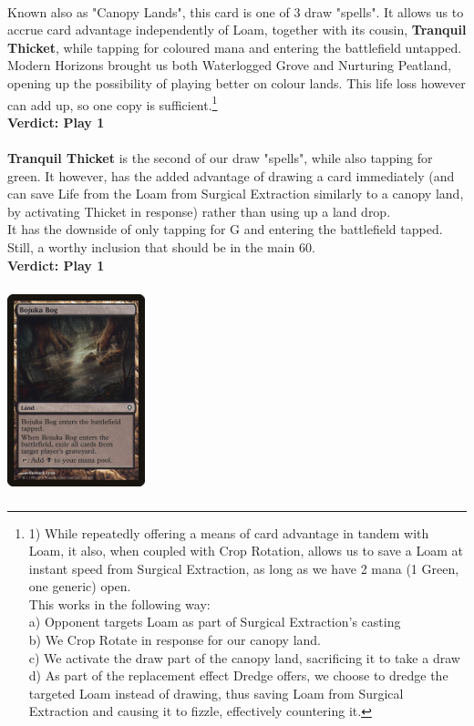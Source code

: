 \documentclass{report}
\begin{document}
\\Known also as "Canopy Lands", this card is one of 3 draw "spells". It allows us to accrue card advantage independently of Loam, together with its cousin, \textbf{Tranquil Thicket}, while tapping for coloured mana and entering the battlefield untapped.\\Modern Horizons brought us both Waterlogged Grove and Nurturing Peatland, opening up the possibility of playing better on colour lands. This life loss however can add up, so one copy is sufficient.\footnote{1) While repeatedly offering a means of card advantage in tandem with Loam, it also, when coupled with Crop Rotation, allows us to save a Loam at instant speed from Surgical Extraction, as long as we have 2 mana (1 Green, one generic) open.\\This works in the following way:\\
		a) Opponent targets Loam as part of Surgical Extraction's casting\\
		b) We Crop Rotate in response for our canopy land.\\
		c) We activate the draw part of the canopy land, sacrificing it to take a draw\\
		d) As part of the replacement effect Dredge offers, we choose to dredge the targeted Loam instead of drawing, thus saving Loam from Surgical Extraction and causing it to fizzle, effectively countering it.}\\
\textbf{Verdict: Play 1}\\\\
\textbf{Tranquil Thicket} is the second of our draw "spells", while also tapping for green. It however, has the added advantage of drawing a card immediately (and can save Life from the Loam from Surgical Extraction similarly to a canopy land, by activating Thicket in response) rather than using up a land drop.\\ It has the downside of only tapping for G and entering the battlefield tapped. Still, a worthy inclusion that should be in the main 60.\\
\textbf{Verdict: Play 1}\\
\begin{center}
\includegraphics [width = 4cm, height = 6cm] {bojuka-bog}
\end{center}
\end{document}
